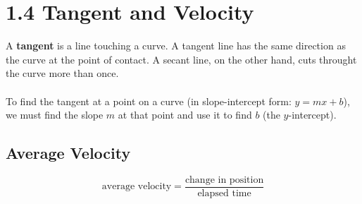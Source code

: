 %
%

\section*{1.4 Tangent and Velocity} 

A \textbf{tangent} is a line touching a curve. A tangent line has the same direction as the curve at the point of contact. A secant line, on the other hand, cuts throught the curve more than once.
\\\\
To find the tangent at a point on a curve (in slope-intercept form: \(y=mx+b\)), we must find the slope \(m\) at that point and use it to find \(b\) (the \(y\)-intercept). 

\subsection*{Average Velocity}

$$\text{average velocity} = \frac{\text{change in position}}{\text{elapsed time}}$$ 
